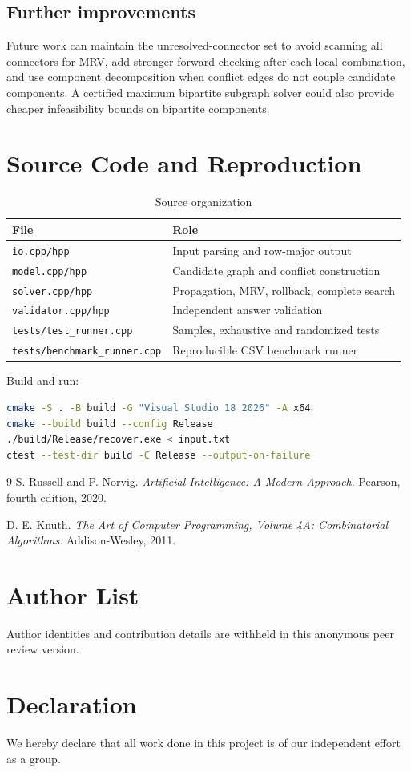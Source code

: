 \documentclass[11pt,a4paper]{article}
\begin{document}
\subsection{Further improvements}

Future work can maintain the unresolved-connector set to avoid scanning all
connectors for MRV, add stronger forward checking after each local combination,
and use component decomposition when conflict edges do not couple candidate
components. A certified maximum bipartite subgraph solver could also provide
cheaper infeasibility bounds on bipartite components.

\appendix
\section{Source Code and Reproduction}

\begin{table}[H]
\centering
\caption{Source organization}
\begin{tabular}{ll}
\toprule
File & Role \\
\midrule
\texttt{io.cpp/hpp} & Input parsing and row-major output \\
\texttt{model.cpp/hpp} & Candidate graph and conflict construction \\
\texttt{solver.cpp/hpp} & Propagation, MRV, rollback, complete search \\
\texttt{validator.cpp/hpp} & Independent answer validation \\
\texttt{tests/test\_runner.cpp} & Samples, exhaustive and randomized tests \\
\texttt{tests/benchmark\_runner.cpp} & Reproducible CSV benchmark runner \\
\bottomrule
\end{tabular}
\end{table}

Build and run:

\begin{lstlisting}[language=bash,caption={Build and execution commands}]
cmake -S . -B build -G "Visual Studio 18 2026" -A x64
cmake --build build --config Release
./build/Release/recover.exe < input.txt
ctest --test-dir build -C Release --output-on-failure
\end{lstlisting}

\begin{thebibliography}{9}
S. Russell and P. Norvig.
\textit{Artificial Intelligence: A Modern Approach}.
Pearson, fourth edition, 2020.

D. E. Knuth.
\textit{The Art of Computer Programming, Volume 4A: Combinatorial Algorithms}.
Addison-Wesley, 2011.
\end{thebibliography}

\section*{Author List}
Author identities and contribution details are withheld in this anonymous peer
review version.

\section*{Declaration}
We hereby declare that all work done in this project is of our independent
effort as a group.
\end{document}
